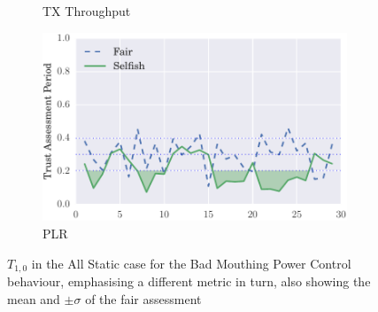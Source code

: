 \documentclass[runningheads,a4paper]{llncs}
\begin{document}
\begin{figure}
\begin{subfigure}{0.32\textwidth}
  \caption{TX Throughput}
  \label{fig:static_badmouthing_txthroughput}
\end{subfigure}
\begin{subfigure}{0.32\textwidth}
\centering
  \includegraphics[width=.95\linewidth]{img/trust_bella_static_emph_PLR_BadMouthingPowerControl.pdf}
  \caption{PLR}
  \label{fig:static_badmouthing_plr}
\end{subfigure}
\caption{$T_{1,0}$ in the All Static case for the Bad Mouthing Power Control behaviour, emphasising a different metric in turn, also showing the mean and $\pm \sigma$ of the fair assessment}
\label{fig:static_badmouthing}
\end{figure}
\end{document}
